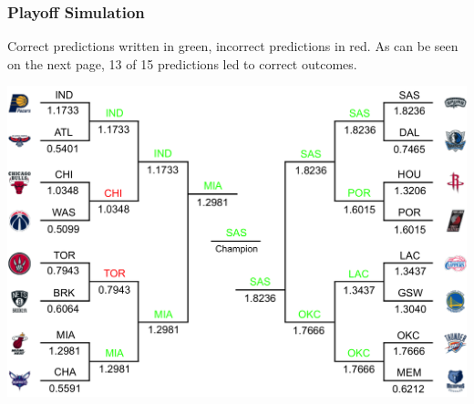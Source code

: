 \documentclass[a4paper,11pt]{article}
\begin{document}
\subsubsection{Playoff Simulation}
Correct predictions written in green, incorrect predictions in red. As can be seen on the next page, 13 of 15 predictions led to correct outcomes. 

\begin{center}
\includegraphics[scale=0.6]{bracket}
\end{center}
\end{document}
